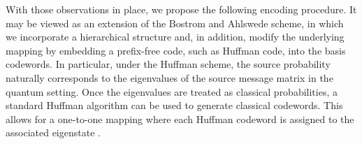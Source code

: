 \documentclass[conference]{IEEEtran}
\newtheorem{procedure}{Procedure}
\begin{document}
With those observations in place, we propose the following encoding procedure. It may be viewed as an extension of the Bostrom \cite{PhysRevA.65.032313} and Ahlswede \cite{ahlswede2003lossless} scheme, in which we incorporate a hierarchical structure and, in addition, modify the underlying mapping by embedding a prefix-free code, such as Huffman code, into the basis codewords. In particular, under the Huffman scheme, the source probability naturally corresponds to the eigenvalues of the source message matrix in the quantum setting. Once the eigenvalues are treated as classical probabilities, a standard Huffman algorithm can be used to generate classical codewords. This allows for a one-to-one mapping where each Huffman codeword is assigned to the associated eigenstate \cite{850709}.




\end{document}
